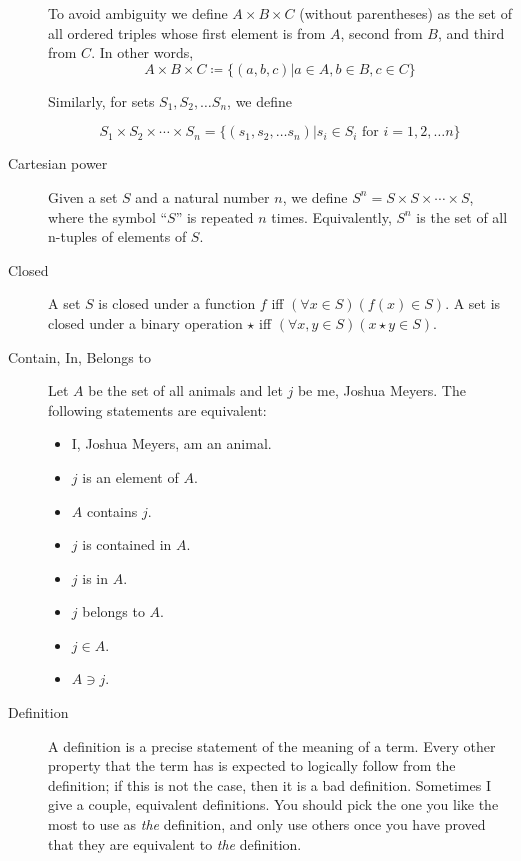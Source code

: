 \documentclass[12pt]{article}
\begin{document}
\begin{description}
    To avoid ambiguity we define $A\times B\times C$ (without
    parentheses) as the set of all ordered triples whose first element
    is from $A$, second from $B$, and third from $C$.  In other
    words, $$A\times B\times C \coloneqq \{(a,b,c)|a\in A, b\in B,
    c\in C\}$$

    Similarly, for sets $S_1,S_2,\ldots S_n$, we define

    $$S_1\times S_2\times\cdots\times S_n = \{(s_1,s_2,\ldots
    s_n)|s_i\in S_i\textrm{ for }i=1,2,\ldots n\}$$

  \item[Cartesian power] Given a set $S$ and a natural number $n$, we
    define $S^n=S\times S\times\cdots\times S$, where the symbol
    ``$S$'' is repeated $n$ times.  Equivalently, $S^n$ is the set of
    all n-tuples of elements of $S$.

  \item[Closed] A set $S$ is closed under a function $f$ iff
    $(\forall x\in S)(f(x)\in S)$.  A set is closed under a binary
    operation $\star$ iff $(\forall x,y\in S)(x\star y\in S)$.
  
  \item[Contain, In, Belongs to] Let $A$ be the set of all animals and let
    $j$ be me, Joshua Meyers.  The following statements are
    equivalent:
    \begin{itemize}
    \item I, Joshua Meyers, am an animal. 
    \item $j$ is an element of $A$. 
    \item $A$ contains $j$. 
    \item $j$ is contained in $A$. 
    \item $j$ is in $A$.
    \item $j$ belongs to $A$.
    \item $j\in A$. 
    \item $A\ni j$. 
    \end{itemize}

  \item[Definition] A definition is a precise statement of the meaning
    of a term.  Every other property that the term has is expected to
    logically follow from the definition; if this is not the case,
    then it is a bad definition.  Sometimes I give a couple,
    equivalent definitions.  You should pick the one you like the most
    to use as \textit{the} definition, and only use others once you
    have proved that they are equivalent to \textit{the} definition.


\end{description}
\end{document}
